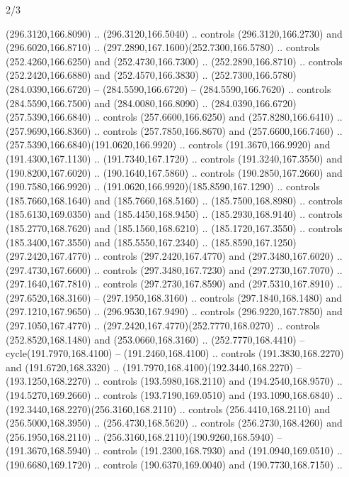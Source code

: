 \begin{flagdescription}{2/3}
\begin{scope}[xshift=0.5\flaglength,yshift=0.5\flagwidth,scale=\flagwidth/259.2]
\begin{scope}[y=0.8pt, x=0.8pt, yscale=-1,shift={(-243,-162)}]
      (296.3120,166.8090) .. (296.3120,166.5040) .. controls (296.3120,166.2730) and
      (296.6020,166.8710) .. (297.2890,167.1600)(252.7300,166.5780) .. controls
      (252.4260,166.6250) and (252.4730,166.7300) .. (252.2890,166.8710) .. controls
      (252.2420,166.6880) and (252.4570,166.3830) ..
      (252.7300,166.5780)(284.0390,166.6720) -- (284.5590,166.6720) --
      (284.5590,166.7620) .. controls (284.5590,166.7500) and (284.0080,166.8090) ..
      (284.0390,166.6720)(257.5390,166.6840) .. controls (257.6600,166.6250) and
      (257.8280,166.6410) .. (257.9690,166.8360) .. controls (257.7850,166.8670) and
      (257.6600,166.7460) .. (257.5390,166.6840)(191.0620,166.9920) .. controls
      (191.3670,166.9920) and (191.4300,167.1130) .. (191.7340,167.1720) .. controls
      (191.3240,167.3550) and (190.8200,167.6020) .. (190.1640,167.5860) .. controls
      (190.2850,167.2660) and (190.7580,166.9920) ..
      (191.0620,166.9920)(185.8590,167.1290) .. controls (185.7660,168.1640) and
      (185.7660,168.5160) .. (185.7500,168.8980) .. controls (185.6130,169.0350) and
      (185.4450,168.9450) .. (185.2930,168.9140) .. controls (185.2770,168.7620) and
      (185.1560,168.6210) .. (185.1720,167.3550) .. controls (185.3400,167.3550) and
      (185.5550,167.2340) .. (185.8590,167.1250)(297.2420,167.4770) .. controls
      (297.2420,167.4770) and (297.3480,167.6020) .. (297.4730,167.6600) .. controls
      (297.3480,167.7230) and (297.2730,167.7070) .. (297.1640,167.7810) .. controls
      (297.2730,167.8590) and (297.5310,167.8910) .. (297.6520,168.3160) --
      (297.1950,168.3160) .. controls (297.1840,168.1480) and (297.1210,167.9650) ..
      (296.9530,167.9490) .. controls (296.9220,167.7850) and (297.1050,167.4770) ..
      (297.2420,167.4770)(252.7770,168.0270) .. controls (252.8520,168.1480) and
      (253.0660,168.3160) .. (252.7770,168.4410) -- cycle(191.7970,168.4100) --
      (191.2460,168.4100) .. controls (191.3830,168.2270) and (191.6720,168.3320) ..
      (191.7970,168.4100)(192.3440,168.2270) -- (193.1250,168.2270) .. controls
      (193.5980,168.2110) and (194.2540,168.9570) .. (194.5270,169.2660) .. controls
      (193.7190,169.0510) and (193.1090,168.6840) ..
      (192.3440,168.2270)(256.3160,168.2110) .. controls (256.4410,168.2110) and
      (256.5000,168.3950) .. (256.4730,168.5620) .. controls (256.2730,168.4260) and
      (256.1950,168.2110) .. (256.3160,168.2110)(190.9260,168.5940) --
      (191.3670,168.5940) .. controls (191.2300,168.7930) and (191.0940,169.0510) ..
      (190.6680,169.1720) .. controls (190.6370,169.0040) and (190.7730,168.7150) ..

\end{scope}
\end{scope}
\end{flagdescription}
